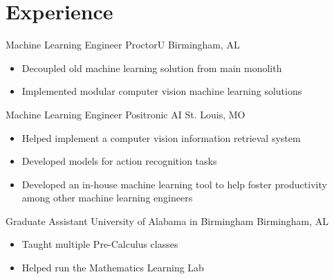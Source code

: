 \section{Experience}


{Machine Learning Engineer}
{ProctorU}
{Birmingham, AL}{}
{
\begin{itemize}%
\item Decoupled old machine learning solution from main monolith
\item Implemented modular computer vision machine learning solutions
\end{itemize}}


{Machine Learning Engineer}
{Positronic AI}
{St. Louis, MO}{}
{
\begin{itemize}%
\item Helped implement a computer vision information retrieval system
\item Developed models for action recognition tasks
\item Developed an in-house machine learning tool to help foster productivity among other machine learning engineers
\end{itemize}}


{Graduate Assistant}
{University of Alabama in Birmingham}
{Birmingham, AL}{}
{
\begin{itemize}%
\item Taught multiple Pre-Calculus classes
\item Helped run the Mathematics Learning Lab
\end{itemize}}

